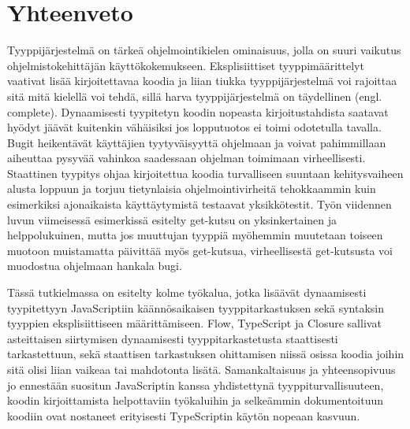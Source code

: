 \chapter{Yhteenveto}

Tyyppijärjestelmä on tärkeä ohjelmointikielen ominaisuus, jolla on suuri
vaikutus ohjelmistokehittäjän käyttökokemukseen.
Eksplisiittiset tyyppimäärittelyt vaativat lisää kirjoitettavaa koodia
ja liian tiukka tyyppijärjestelmä voi rajoittaa sitä mitä kielellä voi tehdä, sillä harva
tyyppijärjestelmä on täydellinen (engl. complete). 
Dynaamisesti tyypitetyn koodin nopeasta kirjoitustahdista saatavat hyödyt jäävät kuitenkin
vähäisiksi jos lopputuotos ei toimi odotetulla tavalla. Bugit heikentävät
käyttäjien tyytyväisyyttä ohjelmaan ja voivat pahimmillaan aiheuttaa
pysyvää vahinkoa saadessaan ohjelman toimimaan virheellisesti.
Staattinen tyypitys ohjaa kirjoitettua koodia turvalliseen suuntaan kehitysvaiheen alusta
loppuun ja torjuu tietynlaisia ohjelmointivirheitä tehokkaammin kuin
esimerkiksi ajonaikaista käyttäytymistä testaavat yksikkötestit.
Työn viidennen luvun viimeisessä esimerkissä esitelty get-kutsu on yksinkertainen
ja helppolukuinen, mutta jos muuttujan  tyyppiä myöhemmin
muutetaan toiseen muotoon muistamatta päivittää myös get-kutsua, virheellisestä
get-kutsusta voi muodostua ohjelmaan hankala bugi.

Tässä tutkielmassa on esitelty kolme työkalua, jotka lisäävät dynaamisesti
tyypitettyyn JavaScriptiin käännösaikaisen tyyppitarkastuksen sekä syntaksin
tyyppien eksplisiittiseen määrittämiseen. Flow, TypeScript ja Closure
sallivat asteittaisen siirtymisen dynaamisesti tyyppitarkastetusta staattisesti
tarkastettuun, sekä staattisen tarkastuksen ohittamisen niissä osissa koodia
joihin sitä olisi liian vaikeaa tai mahdotonta lisätä.
Samankaltaisuus ja yhteensopivuus jo ennestään suositun JavaScriptin kanssa
yhdistettynä tyyppiturvallisuuteen, koodin kirjoittamista helpottaviin
työkaluihin ja selkeämmin dokumentoituun koodiin ovat nostaneet erityisesti
TypeScriptin käytön nopeaan kasvuun.
